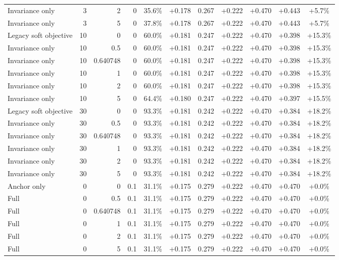 \begin{table}[htbp]
\begin{tabular}{lrrrccccccc}
Invariance only & 3 & 2 & 0 & 35.6\% & +0.178 & 0.267 & +0.222 & +0.470 & +0.443 & +5.7\% \\
Invariance only & 3 & 5 & 0 & 37.8\% & +0.178 & 0.267 & +0.222 & +0.470 & +0.443 & +5.7\% \\
Legacy soft objective & 10 & 0 & 0 & 60.0\% & +0.181 & 0.247 & +0.222 & +0.470 & +0.398 & +15.3\% \\
Invariance only & 10 & 0.5 & 0 & 60.0\% & +0.181 & 0.247 & +0.222 & +0.470 & +0.398 & +15.3\% \\
Invariance only & 10 & 0.640748 & 0 & 60.0\% & +0.181 & 0.247 & +0.222 & +0.470 & +0.398 & +15.3\% \\
Invariance only & 10 & 1 & 0 & 60.0\% & +0.181 & 0.247 & +0.222 & +0.470 & +0.398 & +15.3\% \\
Invariance only & 10 & 2 & 0 & 60.0\% & +0.181 & 0.247 & +0.222 & +0.470 & +0.398 & +15.3\% \\
Invariance only & 10 & 5 & 0 & 64.4\% & +0.180 & 0.247 & +0.222 & +0.470 & +0.397 & +15.5\% \\
Legacy soft objective & 30 & 0 & 0 & 93.3\% & +0.181 & 0.242 & +0.222 & +0.470 & +0.384 & +18.2\% \\
Invariance only & 30 & 0.5 & 0 & 93.3\% & +0.181 & 0.242 & +0.222 & +0.470 & +0.384 & +18.2\% \\
Invariance only & 30 & 0.640748 & 0 & 93.3\% & +0.181 & 0.242 & +0.222 & +0.470 & +0.384 & +18.2\% \\
Invariance only & 30 & 1 & 0 & 93.3\% & +0.181 & 0.242 & +0.222 & +0.470 & +0.384 & +18.2\% \\
Invariance only & 30 & 2 & 0 & 93.3\% & +0.181 & 0.242 & +0.222 & +0.470 & +0.384 & +18.2\% \\
Invariance only & 30 & 5 & 0 & 93.3\% & +0.181 & 0.242 & +0.222 & +0.470 & +0.384 & +18.2\% \\
Anchor only & 0 & 0 & 0.1 & 31.1\% & +0.175 & 0.279 & +0.222 & +0.470 & +0.470 & +0.0\% \\
Full & 0 & 0.5 & 0.1 & 31.1\% & +0.175 & 0.279 & +0.222 & +0.470 & +0.470 & +0.0\% \\
Full & 0 & 0.640748 & 0.1 & 31.1\% & +0.175 & 0.279 & +0.222 & +0.470 & +0.470 & +0.0\% \\
Full & 0 & 1 & 0.1 & 31.1\% & +0.175 & 0.279 & +0.222 & +0.470 & +0.470 & +0.0\% \\
Full & 0 & 2 & 0.1 & 31.1\% & +0.175 & 0.279 & +0.222 & +0.470 & +0.470 & +0.0\% \\
Full & 0 & 5 & 0.1 & 31.1\% & +0.175 & 0.279 & +0.222 & +0.470 & +0.470 & +0.0\% \\

\end{tabular}
\end{table}
